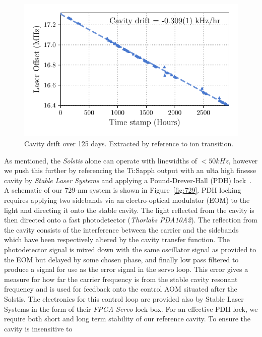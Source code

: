     \begin{figure}
        \begin{center}
        \noindent\includegraphics[width=0.75\linewidth]{
            figures/pdf_figure/cavity_drift.pdf
            }
        \end{center}
        \caption{
            Cavity drift over 125 days. Extracted by reference to ion transition.
            }
        \label{fig:Cavity Drift}
    \end{figure}
    As mentioned, the \emph{Solstis} alone can operate with linewidths of
    $<50kHz$, however we push this further by referencing the Ti:Sapph output
    with an ulta high finesse cavity by \emph{Stable Laser Systems} and applying
    a Pound-Drever-Hall (PDH) lock~\cite{}.  A schematic of our 729-nm system is
    shown in Figure~\ref{fig:729}.  PDH locking requires applying two sidebands
    via an electro-optical modulator (EOM) to the light and directing it onto
    the stable cavity. The light reflected from the cavity is then directed onto
    a fast photodetector (\emph{Thorlabs PDA10A2}). The reflection from the
    cavity consists of the interference between the carrier and the sidebands
    which have been respectively altered by the cavity transfer function. The
    photodetector signal is mixed down with the same oscillator signal as
    provided to the EOM but delayed by some chosen phase, and finally low pass
    filtered to produce a signal for use as the error signal in the servo loop.
    This error gives a measure for how far the carrier frequency is from the
    stable cavity resonant frequency and is used for feedback onto the control
    AOM situated after the Solstis. The electronics for this control loop are
    provided also by Stable Laser Systems in the form of their \emph{FPGA Servo}
    lock box. For an effective PDH lock, we require both short and long term
    stability of our reference cavity. To ensure the cavity is insensitive to
